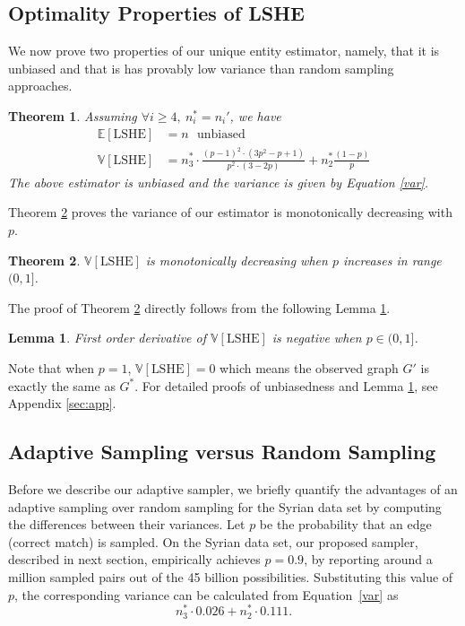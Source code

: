 \documentclass[aoas]{imsart}
\newtheorem{lemma}{Lemma}
\newtheorem{theorem}{Theorem}
\begin{document}
\subsection{Optimality Properties of LSHE}
We now prove two properties of our unique entity estimator, namely, that it is unbiased and that is has provably low variance than random sampling approaches.

\begin{theorem}
	\label{thm:thm1}
	Assuming  $\forall i \ge 4, \ n_i^* = n_i'$, we have
	\begin{align}\label{eq:thm1}
	\mathbb{E}[\text{LSHE}] &=  n   \ \ \ \mbox{unbiased} \\
	\label{var}
	\mathbb{V}[\text{LSHE}] &= n_3^* \cdot \frac{(p-1)^2 \cdot (3p^2-p+1)}{p^2 \cdot (3-2p)} + n_2^*\frac{(1-p)}{p}
	\end{align}
	The above estimator is unbiased and the variance is given by Equation \ref{var}.
\end{theorem}
Theorem \ref{thm:thm2} proves the variance of our estimator is monotonically decreasing with $p$.
\begin{theorem}
	\label{thm:thm2}
	$\mathbb{V}[\text{LSHE}]$ is monotonically decreasing when $p$ increases in  range $(0,1]$.
\end{theorem}

The proof of Theorem \ref{thm:thm2} directly follows from the following Lemma \ref{lemma}.
\begin{lemma}
	\label{lemma}
	First order derivative of $\mathbb{V}[\text{LSHE}]$ is negative when $p \in (0,1]$.
\end{lemma}
Note that when $p=1$, $\mathbb{V}[\text{LSHE}] = 0$ which means the observed graph $G'$ is exactly the same as $G^*$. For detailed proofs of unbiasedness and Lemma \ref{lemma}, see Appendix \ref{sec:app}.

\subsection{Adaptive Sampling versus Random Sampling}
\label{sec:randVsAdaptive}
Before we describe our adaptive sampler, we briefly quantify the advantages of an adaptive sampling over random sampling for the Syrian data set by computing the differences between their variances. Let $p$ be the probability that an edge (correct match) is sampled. On the Syrian data set, our proposed sampler, described in next section, empirically achieves $p = 0.9$, by reporting around a million sampled pairs out of the 45 billion possibilities. Substituting this value of $p$, the corresponding variance can be calculated from Equation~\ref{var} as $$n_3^* \cdot 0.026 + n_2^*\cdot 0.111.$$
\end{document}
